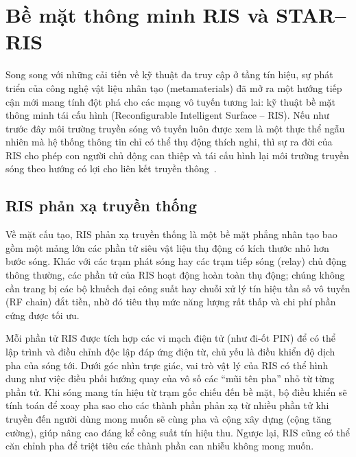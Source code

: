 

\section{Bề mặt thông minh RIS và STAR--RIS}
\label{sec:ris-star}

Song song với những cải tiến về kỹ thuật đa truy cập ở tầng tín hiệu, sự phát triển của công nghệ vật
liệu nhân tạo (metamaterials) đã mở ra một hướng tiếp cận mới mang tính đột phá cho các mạng vô tuyến
tương lai: kỹ thuật bề mặt thông minh tái cấu hình (Reconfigurable Intelligent Surface -- RIS). Nếu như
trước đây môi trường truyền sóng vô tuyến luôn được xem là một thực thể ngẫu nhiên mà hệ thống thông tin
chỉ có thể thụ động thích nghi, thì sự ra đời của RIS cho phép con người chủ động can thiệp và tái cấu
hình lại môi trường truyền sóng theo hướng có lợi cho liên kết truyền thông~\cite{DiRenzo2020SmartRadio}.

\subsection{RIS phản xạ truyền thống}
\label{ssec:ris}


Về mặt cấu tạo, RIS phản xạ truyền thống là một bề mặt phẳng nhân tạo bao gồm một mảng lớn các phần tử
siêu vật liệu thụ động có kích thước nhỏ hơn bước sóng. Khác với các trạm phát sóng hay các trạm tiếp sóng
(relay) chủ động thông thường, các phần tử của RIS hoạt động hoàn toàn thụ động; chúng không cần trang bị
các bộ khuếch đại công suất hay chuỗi xử lý tín hiệu tần số vô tuyến (RF chain) đắt tiền, nhờ đó tiêu thụ
mức năng lượng rất thấp và chi phí phần cứng được tối ưu.

Mỗi phần tử RIS được tích hợp các vi mạch điện tử (như đi-ốt PIN) để có thể lập trình và điều chỉnh độc
lập đáp ứng điện từ, chủ yếu là điều khiển độ dịch pha của sóng tới. Dưới góc nhìn trực giác, vai trò vật
lý của RIS có thể hình dung như việc điều phối hướng quay của vô số các ``mũi tên pha'' nhỏ từ từng phần
tử. Khi sóng mang tín hiệu từ trạm gốc chiếu đến bề mặt, bộ điều khiển sẽ tính toán để xoay pha sao cho
các thành phần phản xạ từ nhiều phần tử khi truyền đến người dùng mong muốn sẽ cùng pha và cộng xây dựng
(cộng tăng cường), giúp nâng cao đáng kể công suất tín hiệu thu. Ngược lại, RIS cũng có thể căn chỉnh pha
để triệt tiêu các thành phần can nhiễu không mong muốn.


